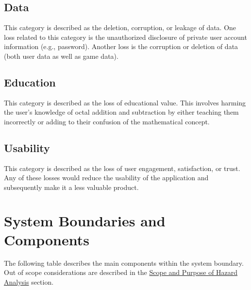 \documentclass{article}
\begin{document}
\subsection{Data}

This category is described as the deletion, corruption, or leakage of data. One loss related to this category is the unauthorized disclosure of private user account information (e.g., password). Another loss is the corruption or deletion of data (both user data as well as game data).

\subsection{Education}

This category is described as the loss of educational value. This involves harming the user's knowledge of octal addition and subtraction by either teaching them incorrectly or adding to their confusion of the mathematical concept.

\subsection{Usability}

This category is described as the loss of user engagement, satisfaction, or trust. Any of these losses would reduce the usability of the application and subsequently make it a less valuable product.

\section{System Boundaries and Components}

The following table describes the main components within the system boundary. Out of scope considerations are described in the \hyperref[sec:ScopeandPurpose]{Scope and Purpose of Hazard Analysis} section.
\end{document}
